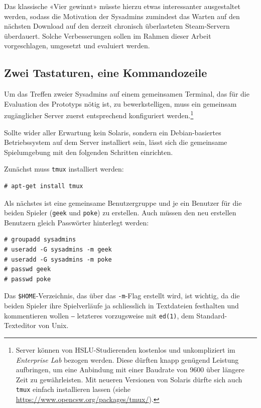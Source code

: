 \documentclass[a4paper,11pt,hidelinks]{scrartcl}
\begin{document}
Das klassische «Vier gewinnt» müsste hierzu etwas interessanter ausgestaltet werden, sodass die Motivation der Sysadmins zumindest das Warten auf den nächsten Download auf den derzeit chronisch überlasteten Steam-Servern überdauert. Solche Verbesserungen sollen im Rahmen dieser Arbeit vorgeschlagen, umgesetzt und evaluiert werden.

\subsection{Zwei Tastaturen, eine Kommandozeile}

Um das Treffen zweier Sysadmins auf einem gemeinsamen Terminal, das für die Evaluation des Prototyps nötig ist, zu bewerkstelligen, muss ein gemeinsam zugänglicher Server zuerst entsprechend konfiguriert werden.\footnote{Server können von HSLU-Studierenden kostenlos und unkompliziert im \textit{Enterprise Lab} bezogen werden. Diese dürften knapp genügend Leistung aufbringen, um eine Anbindung mit einer Baudrate von 9600 über längere Zeit zu gewährleisten. Mit neueren Versionen von Solaris dürfte sich auch \texttt{tmux} einfach installieren lassen (siehe \url{https://www.opencsw.org/packages/tmux/}).}

Sollte wider aller Erwartung kein Solaris, sondern ein Debian-basiertes Betriebssystem auf dem Server installiert sein, lässt sich die gemeinsame Spielumgebung mit den folgenden Schritten einrichten.

Zunächst muss \texttt{tmux} installiert werden:

\begin{lstlisting}
# apt-get install tmux
\end{lstlisting}

Als nächstes ist eine gemeinsame Benutzergruppe und je ein Benutzer für die beiden Spieler (\texttt{geek} und \texttt{poke}) zu erstellen. Auch müssen den neu erstellen Benutzern gleich Passwörter hinterlegt werden:

\begin{lstlisting}
# groupadd sysadmins
# useradd -G sysadmins -m geek
# useradd -G sysadmins -m poke
# passwd geek
# passwd poke
\end{lstlisting}

Das \texttt{\$HOME}-Verzeichnis, das über das \texttt{-m}-Flag erstellt wird, ist wichtig, da die beiden Spieler ihre Spielverläufe ja schliesslich in Textdateien festhalten und kommentieren wollen ‒ letzteres vorzugsweise mit \texttt{ed(1)}, dem Standard-Texteditor von Unix.
\end{document}
